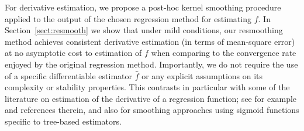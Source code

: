 \documentclass[aos]{imsart}
\begin{document}
%	
%	
%
%	
%	
	
	For derivative estimation, we propose a post-hoc kernel smoothing procedure applied to the output of the chosen regression method for estimating $f$.
 In Section~\ref{sect:resmooth} we show that under mild conditions,
	our resmoothing method achieves consistent derivative estimation (in terms of mean-square error) at no asymptotic cost to estimation of $f$ when comparing to the convergence rate enjoyed by the original regression method. Importantly, we do not require the use of a specific differentiable estimator $\hat{f}$ or any explicit assumptions on its complexity or stability properties. %
	This contrasts in particular with some of the literature on estimation of the derivative of a regression function; see for example \citet{dai2016optimal} and references therein, and also \citet{da2008tree,fonseca2018boost} for  smoothing approaches  using sigmoid functions specific to tree-based estimators.
	
\end{document}
